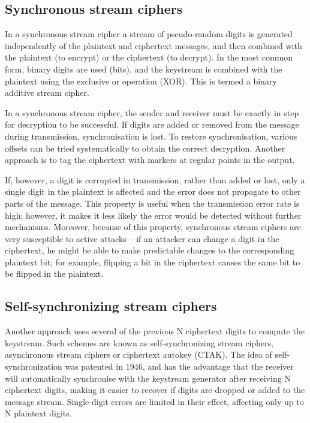 \subsection{Synchronous stream ciphers}
In a synchronous stream cipher a stream of pseudo-random digits is generated independently of the plaintext and ciphertext messages, and then combined with the plaintext (to encrypt) or the ciphertext (to decrypt). In the most common form, binary digits are used (bits), and the keystream is combined with the plaintext using the exclusive or operation (XOR). This is termed a binary additive stream cipher.

In a synchronous stream cipher, the sender and receiver must be exactly in step for decryption to be successful. If digits are added or removed from the message during transmission, synchronisation is lost. To restore synchronisation, various offsets can be tried systematically to obtain the correct decryption. Another approach is to tag the ciphertext with markers at regular points in the output.

If, however, a digit is corrupted in transmission, rather than added or lost, only a single digit in the plaintext is affected and the error does not propagate to other parts of the message. This property is useful when the transmission error rate is high; however, it makes it less likely the error would be detected without further mechanisms. Moreover, because of this property, synchronous stream ciphers are very susceptible to active attacks -- if an attacker can change a digit in the ciphertext, he might be able to make predictable changes to the corresponding plaintext bit; for example, flipping a bit in the ciphertext causes the same bit to be flipped in the plaintext.

\subsection{Self-synchronizing stream ciphers}
Another approach uses several of the previous N ciphertext digits to compute the keystream. Such schemes are known as self-synchronizing stream ciphers, asynchronous stream ciphers or ciphertext autokey (CTAK). The idea of self-synchronization was patented in 1946, and has the advantage that the receiver will automatically synchronise with the keystream generator after receiving N ciphertext digits, making it easier to recover if digits are dropped or added to the message stream. Single-digit errors are limited in their effect, affecting only up to N plaintext digits.

